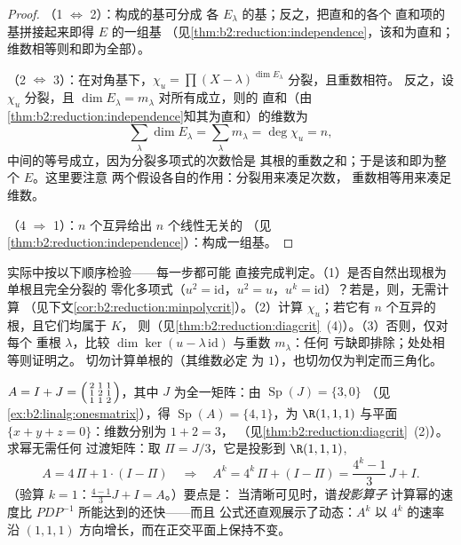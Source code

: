 \begin{proof}
（1 $\iff$ 2）：构成的基可分成
各 $E_\lambda$ 的基；反之，把直和的各个
直和项的基拼接起来即得 $E$ 的一组基
（见\cref{thm:b2:reduction:independence}，该和为直和；
维数相等则和即为全部）。

（2 $\iff$ 3）：在对角基下，$\chi_u = \prod (X -
\lambda)^{\dim E_\lambda}$ 分裂，且重数相符。
反之，设 $\chi_u$ 分裂，且 $\dim E_\lambda =
m_\lambda$ 对所有成立，则的
直和（由\cref{thm:b2:reduction:independence}知其为直和）的维数为
\[
\sum_{\lambda}\dim E_\lambda = \sum_{\lambda} m_\lambda =
\deg\chi_u = n ,
\]
中间的等号成立，因为分裂多项式的次数恰是
其根的重数之和；于是该和即为整个 $E$。这里要注意
两个假设各自的作用：分裂用来凑足次数，
重数相等用来凑足维数。

（4 $\Rightarrow$ 1）：$n$ 个互异给出 $n$ 个线性无关的
（见\cref{thm:b2:reduction:independence}）：构成一组基。
\end{proof}

\begin{method}[判定可对角化]\label{met:b2:reduction:decide}
实际中按以下顺序检验——每一步都可能
直接完成判定。（1）是否自然出现根为单根且完全分裂的
零化多项式（$u^2 = \mathrm{id}$，$u^2 = u$，$u^k =
\mathrm{id}$）？若是，则，无需计算
（见下文\cref{cor:b2:reduction:minpolycrit}）。（2）计算
$\chi_u$；若它有 $n$ 个互异的根，且它们均属于 $K$，
则（见\cref{thm:b2:reduction:diagcrit}~(4)）。（3）否则，仅对每个
重根 $\lambda$，比较 $\dim\ker(u -
\lambda\,\mathrm{id})$ 与重数 $m_\lambda$：任何
亏缺即排除；处处相等则证明之。
切勿计算单根的（其维数必定
为 $1$），也切勿仅为判定而三角化。
\end{method}

\begin{example}[对角化的应用]\label{ex:b2:reduction:diagwork}
$A = I + J = \begin{psmallmatrix}2 & 1 & 1\\ 1 & 2 & 1\\ 1 & 1 &
2\end{psmallmatrix}$，其中 $J$ 为全一矩阵：由
$\operatorname{Sp}(J) = \{3, 0\}$
（见\cref{ex:b2:linalg:onesmatrix}），得 $\operatorname{Sp}(A) = \{4,
1\}$，为 $\R(1,1,1)$ 与平面 $\{x + y + z =
0\}$：维数分别为 $1 + 2 = 3$，
（见\cref{thm:b2:reduction:diagcrit}~(2)）。求幂无需任何
过渡矩阵：取 $\Pi = J/3$，它是投影到
$\R(1,1,1)$,
\[
A = 4\,\Pi + 1\cdot(I - \Pi)
\quad\Longrightarrow\quad
A^k = 4^k\,\Pi + (I - \Pi)
= \frac{4^k - 1}{3}\,J + I .
\]
（验算 $k = 1$：$\frac{4-1}3 J + I = A$。）要点是：
当清晰可见时，谱\emph{投影算子}
计算幂的速度比 $PDP^{-1}$ 所能达到的还快——而且
公式还直观展示了动态：$A^k$ 以 $4^k$ 的速率
沿 $(1,1,1)$ 方向增长，而在正交平面上保持不变。
\end{example}


